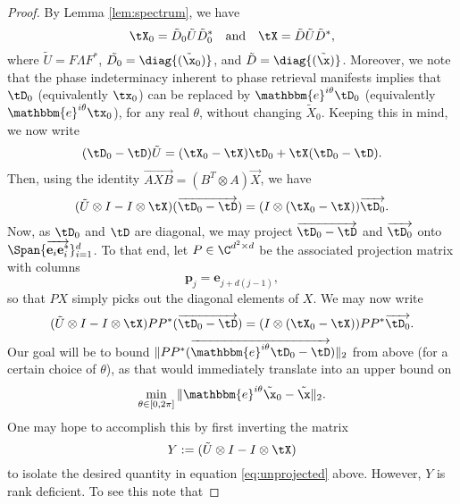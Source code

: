 \begin{proof}

By Lemma \ref{lem:spectrum}, we have%
%
 \[\tX_0 = \tilde{D}_0 \tilde{U} \tilde{D}_0^* \quad \text{and} \quad \tX = \tilde{D} \tilde{U} \tilde{D}^*,\]
 where  $\tilde{U} = F \Lambda F^*$, %
 $\tilde{D_0} = \diag{(\tilde{\x}_0)}$, and $\tilde{D} = \diag{(\tilde{\x})}$. Moreover, we note that the phase indeterminacy inherent to phase retrieval manifests implies that $\tD_0$ (equivalently $\tx_0$) can be replaced by ${\mathbbm{e}}^{i\theta} \tD_0$ (equivalently $\mathbbm{e}^{i\theta}\tx_0$), for any real $\theta$, without changing $\tilde{X}_0$. Keeping this in mind, we now write
  \[(\tD_0 - \tD)\tilde{U} = (\tX_0 - \tX) \tD_0 + \tX (\tD_0 - \tD).\]
Then, using the identity $\overrightarrow{AXB} = (B^T \otimes A) \overrightarrow{X}$, we have 
 \[(\tilde{U} \otimes I - I \otimes \tX) (\overrightarrow{\tD_0 - \tD}) = (I \otimes (\tX_0 - \tX))\overrightarrow{\tD_0}.\]
Now, as $\tD_0$ and $\tD$ are diagonal, we may project $\overrightarrow{\tD_0 - \tD}$ and $\overrightarrow{\tD_0}$ onto $\Span\{\overrightarrow{\mathbf{e}_i \mathbf{e}_i^*}\}_{i=1}^d$. To that end, let $P\in  \C^{d^2 \times d}$ be the associated projection matrix with columns \[\mathbf{p}_j = \mathbf{e}_{j + d(j-1)},\] so that $PX$ simply picks out the diagonal elements of $X$. We may now write
%
\begin{equation}(\tilde{U} \otimes I - I \otimes \tX)PP^* (\overrightarrow{\tD_0 - \tD}) = (I \otimes (\tX_0 - \tX))PP^* \overrightarrow{\tD_0}.\label{eq:unprojected}\end{equation}
%
Our goal will be to bound $\|PP^*(\overrightarrow{\mathbbm{e}^{i\theta}\tD_0 - \tD})\|_2$ from above (for a certain choice of $\theta$), as that would immediately translate into an upper bound on 
%
\begin{equation}\min\limits_{\theta\in [0,2\pi]}\| \mathbbm{e}^{i\theta}\tilde{\x}_0 -\tilde{\x} \|_2.\label{eq:phase_ind}\end{equation} 
%
One may hope to accomplish this by first inverting the matrix %
\[Y := (\tilde{U} \otimes I - I \otimes \tX)\] 
to isolate the desired quantity in  equation \eqref{eq:unprojected} above. However, $Y$  is rank deficient. To see this note that 

\end{proof}
